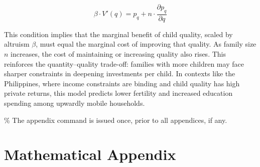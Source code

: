 \documentclass[]{AEA}
\begin{document}
\[
\beta \cdot V'(q) = p_q + n \cdot \frac{\partial p_q}{\partial q}
\]

This condition implies that the marginal benefit of child quality,
scaled by altruism \(\beta\), must equal the marginal cost of improving
that quality. As family size \(n\) increases, the cost of maintaining or
increasing quality also rises. This reinforces the quantity--quality
trade-off: families with more children may face sharper constraints in
deepening investments per child. In contexts like the Philippines, where
income constraints are binding and child quality has high private
returns, this model predicts lower fertility and increased education
spending among upwardly mobile households.




\% The appendix command is issued once, prior to all appendices, if any.
\appendix

\section{Mathematical Appendix}
\end{document}

